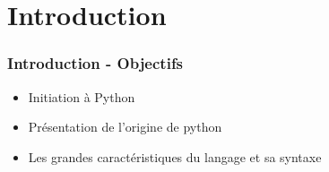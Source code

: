 \section{Introduction}

\begin{frame}
  \frametitle{Introduction - Objectifs}
  \begin{itemize}
    \item Initiation à Python
    \item Présentation de l'origine de python
    \item Les grandes caractéristiques du langage et sa syntaxe
  \end{itemize}

\end{frame}


